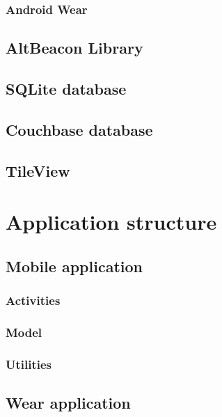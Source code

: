 \subsubsection{Android Wear}
\label{subsec:AndroidWear}

\subsection{AltBeacon Library}
\label{subsec:AltBeaconLibrary}

\subsection{SQLite database}
\label{subsec:SQLiteDatabase}

\subsection{Couchbase database}
\label{subsec:CouchbaseDatabase}

\subsection{TileView}
\label{subsec:TileView}

\section{Application structure}
\label{sec:ApplicationStructure}

\subsection{Mobile application}
\label{subsec:MobileApplication}

\subsubsection{Activities}
\label{subsec:Activities}

\subsubsection{Model}
\label{subsec:Model}

\subsubsection{Utilities}
\label{subsec:Utilities}

\subsection{Wear application}
\label{subsec:WearApplication}